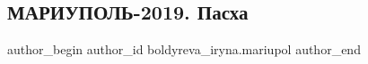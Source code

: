  
 
 
 
 
 
\subsection{МАРИУПОЛЬ-2019. Пасха}
\label{sec:06_05_2019.fb.boldyreva_iryna.mariupol.1.easter_2019}
 
\ifcmt
 author_begin
   author_id boldyreva_iryna.mariupol
 author_end
\fi
